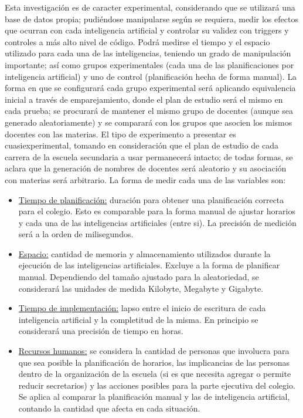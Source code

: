 \normalsize{ \indent
Esta investigación es de caracter experimental,
considerando que se utilizará una base de datos
propia; pudiéndose manipularse según se requiera,
medir los efectos que ocurran con cada inteligencia
artificial y controlar su validez con triggers
y controles a más alto nivel de código. Podrá
medirse el tiempo y el espacio utilizado para
cada una de las inteligencias, teniendo un grado
de manipulación importante; así como grupos
experimentales (cada una de las planificaciones
por inteligencia artificial) y uno de control
(planificación hecha de forma manual).
}
\newline
\normalsize{ \indent
La forma en que se configurará cada grupo
experimental será aplicando equivalencia
inicial a través de emparejamiento, donde
el plan de estudio será el mismo en cada
prueba; se procurará de mantener el mismo
grupo de docentes (aunque sea generado
aleatoriamente) y se comparará con los
grupos que asocien los mismos docentes con
las materias.
}
\newline
\normalsize{ \indent
El tipo de experimento a presentar es
cuasiexperimental, tomando en consideración que
el plan de estudio de cada carrera de la
escuela secundaria a usar permanecerá intacto;
de todas formas, se aclara que la generación
de nombres de docentes será aleatorio y su
asociación con materias será arbitrario.
}
\newline
\normalsize{ \indent
La forma de medir cada una de las variables son:
}
\begin{itemize}
  \item \underline{Tiempo de planificación:}
  duración para obtener una planificación correcta
  para el colegio. Esto es comparable para la
  forma manual de ajustar horarios y cada una de
  las inteligencias artificiales (entre si).
  La precisión de medición será a la orden de
  milisegundos.
  \item \underline{Espacio:} cantidad de memoria
  y almacenamiento utilizados durante la ejecución
  de las inteligencias artificiales. Excluye a
  la forma de planificar manual. Dependiendo del
  tamaño ajustado para la aleatoriedad, se considerará
  las unidades de medida Kilobyte, Megabyte y Gigabyte.
  \item \underline{Tiempo de implementación:}
  lapso entre el inicio de escritura de cada
  inteligencia artificial y la completitud de la
  misma. En principio se considerará una precisión
  de tiempo en horas.
  \item \underline{Recursos humanos:} se considera
  la cantidad de personas que involucra para
  que sea posible la planificación de horarios,
  las implicancias de las personas dentro de la
  organización de la escuela (si es que necesita
  agregar o permite reducir secretarios) y las
  acciones posibles para la parte ejecutiva del
  colegio. Se aplica al comparar la planificación
  manual y las de inteligencia artificial,
  contando la cantidad que afecta en cada
  situación.
\end{itemize}
